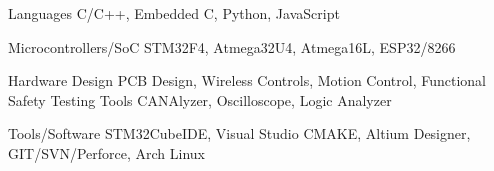 


\begin{cvskills}


    \cvskill
    {Languages} %
    {C/C++, Embedded C, Python, JavaScript} %

    \cvskill
    {Microcontrollers/SoC} %
    {STM32F4, Atmega32U4, Atmega16L, ESP32/8266}

    \cvskill
    {Hardware Design} %
    {PCB Design, Wireless Controls, Motion Control, Functional Safety} %
    \cvskill
    {Testing Tools} %
    {CANAlyzer, Oscilloscope, Logic Analyzer}

    \cvskill
    {Tools/Software} %
    {STM32CubeIDE, Visual Studio CMAKE, Altium Designer, GIT/SVN/Perforce, Arch Linux} %


\end{cvskills}